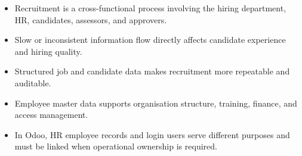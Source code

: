 \begin{chapterrecap}
\begin{itemize}
  \item Recruitment is a cross-functional process involving the hiring department, HR, candidates, assessors, and approvers.
  \item Slow or inconsistent information flow directly affects candidate experience and hiring quality.
  \item Structured job and candidate data makes recruitment more repeatable and auditable.
  \item Employee master data supports organisation structure, training, finance, and access management.
  \item In Odoo, HR employee records and login users serve different purposes and must be linked when operational ownership is required.
\end{itemize}
\end{chapterrecap}
